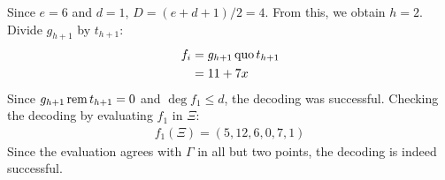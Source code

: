 \documentclass[11pt,a4paper]{article}
\begin{document}
\begin{enumerate}
\begin{enumerate}
\begin{center}
{\begin{tabular}{l|l|l|l|l}
                            \end{tabular}
                        }
                    \end{center}
                    Since $e = 6$ and $d = 1$, $D =(e + d + 1)/2 = 4$. From this, we obtain $h = 2$. Divide $g_{h + 1}$ by $t_{h + 1}$:
                    \begin{align*}
                        f_i & = g_{h + 1} \operatorname{quo}{t_{h + 1}} \\
                            & = 11 + 7x
                    \end{align*}
                    Since $g_{h + 1} \operatorname{rem}{t_{h + 1}} = 0$ and $\deg{f_1} \leq d$, the decoding was successful.
                    Checking the decoding by evaluating $f_1$ in $\Xi$:
                    \begin{align*}
                        f_1(\Xi) = (5, 12, 6, 0, 7, 1)
                    \end{align*}
                    Since the evaluation agrees with $\Gamma$ in all but two points, the decoding is indeed successful.
          \end{enumerate}

          \newpage


\end{enumerate}
\end{document}
